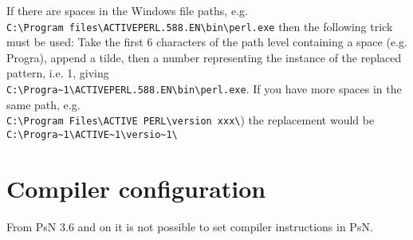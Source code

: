 If there are spaces in the Windows file paths, e.g. \\
\verb|C:\Program files\ACTIVEPERL.588.EN\bin\perl.exe| 
then the following trick must be used: Take the first 6 characters of the path level containing a space (e.g. Progra), append a tilde, then a number representing the instance of the replaced pattern, i.e. 1, 
giving\\
\verb|C:\Progra~1\ACTIVEPERL.588.EN\bin\perl.exe|. 
If you have more spaces in the same path, e.g.\\ 
\verb|C:\Program Files\ACTIVE PERL\version xxx\|) 
the replacement would be \\
\verb|C:\Progra~1\ACTIVE~1\versio~1\|

\section{Compiler configuration}

From PsN 3.6 and on it is not possible to set compiler instructions in PsN.


